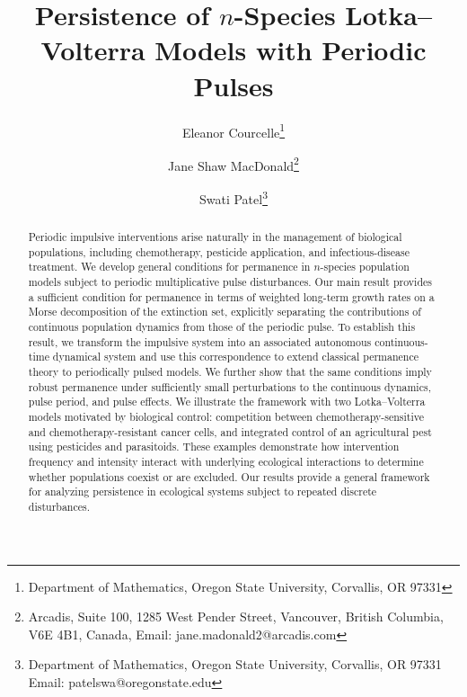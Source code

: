 \documentclass{article}
\title{Persistence of \(n\)-Species Lotka--Volterra Models with Periodic Pulses}
\author{Eleanor Courcelle\thanks{Department of Mathematics,
Oregon State University,
Corvallis, OR 97331}\and Jane Shaw MacDonald\thanks{Arcadis, Suite 100, 1285 West Pender Street, Vancouver, British Columbia, V6E 4B1, Canada, Email: jane.madonald2@arcadis.com } \and
Swati Patel\thanks{Department of Mathematics,
Oregon State University,
Corvallis, OR 97331\\
Email: patelswa@oregonstate.edu}}
\date{}
\theoremstyle{definition}
\begin{document}
\maketitle

\begin{abstract}
Periodic impulsive interventions arise naturally in the management of biological populations, including chemotherapy, pesticide application, and infectious-disease treatment. We develop general conditions for permanence in \(n\)-species population models subject to periodic multiplicative pulse disturbances. Our main result provides a sufficient condition for permanence in terms of weighted long-term growth rates on a Morse decomposition of the extinction set, explicitly separating the contributions of continuous population dynamics from those of the periodic pulse. To establish this result, we transform the impulsive system into an associated autonomous continuous-time dynamical system and use this correspondence to extend classical permanence theory to periodically pulsed models. We further show that the same conditions imply robust permanence under sufficiently small perturbations to the continuous dynamics, pulse period, and pulse effects. We illustrate the framework with two Lotka--Volterra models motivated by biological control: competition between chemotherapy-sensitive and chemotherapy-resistant cancer cells, and integrated control of an agricultural pest using pesticides and parasitoids. These examples demonstrate how intervention frequency and intensity interact with underlying ecological interactions to determine whether populations coexist or are excluded. Our results provide a general framework for analyzing persistence in ecological systems subject to repeated discrete disturbances.
\end{abstract}
\end{document}
